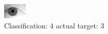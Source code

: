 \begin{figure}[h!]
\begin{center}
\includegraphics[width=0.60\columnwidth]{figures/ID2132_class_4_target_3.png}
\end{center}
\caption{ Classification: 4 actual target: 3}
\label{fig:ID2132_class_4_target_3}
\end{figure}
